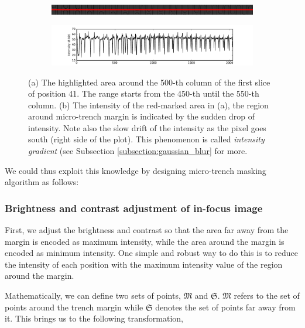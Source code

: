 \documentclass[pdftex,12pt,a4paper]{report}
\begin{document}
\begin{figure}[H]
\centering

\begin{subfigure}{\textwidth}
  \centering
  \includegraphics[width=\textwidth]{images/pos_41_cut_highlight_y_500}
  \caption{}
  \label{fig:pos41_highlight}
\end{subfigure}%

\begin{subfigure}{\textwidth}
  \centering
  \includegraphics[width=\textwidth]{images/pos_41_cut_highlight_y_500_contrast}
  \caption{}
  \label{fig:pos41_contrast}
\end{subfigure}%
\caption{(a) The highlighted area around the 500-th column of the first slice of position 41. The range starts from the 450-th until the 550-th column. (b) The intensity of the red-marked area in (a), the region around micro-trench margin is indicated by the sudden drop of intensity. Note also the slow drift of the intensity as the pixel goes south (right side of the plot). This phenomenon is called \textit{intensity gradient} (see Subsection \ref{subsection:gaussian_blur} for more.}
\label{fig:pos41_brightness}
\end{figure}

We could thus exploit this knowledge by designing micro-trench masking algorithm as follows:

\subsubsection*{Brightness and contrast adjustment of in-focus image}

First, we adjust the brightness and contrast so that the area far away from the margin is encoded as maximum intensity, while the area around the margin is encoded as minimum intensity. One simple and robust way to do this is to reduce the intensity of each position with the maximum intensity value of the region around the margin.

Mathematically, we can define two sets of points, $\mathfrak{M}$ and $\mathfrak{S}$. $\mathfrak{M}$ refers to the set of points around the trench margin while $\mathfrak{S}$ denotes the set of points far away from it. This brings us to the following transformation,
\end{document}
